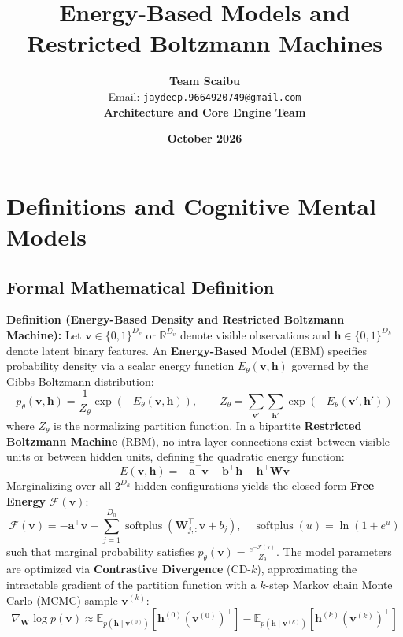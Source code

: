 \documentclass[11pt,a4paper]{article}
\title{\textbf{Energy-Based Models and Restricted Boltzmann Machines}}
\author{\textbf{Team Scaibu} \\ \small Email: \texttt{jaydeep.9664920749@gmail.com} \\ \small \textbf{Architecture and Core Engine Team}}
\date{\textbf{October 2026}}
\theoremstyle{definition}
\begin{document}
\maketitle

\section{Definitions and Cognitive Mental Models}

\subsection{Formal Mathematical Definition}
\textbf{Definition (Energy-Based Density and Restricted Boltzmann Machine):}
Let $\mathbf{v} \in \{0, 1\}^{D_v}$ or $\mathbb{R}^{D_v}$ denote visible observations and $\mathbf{h} \in \{0, 1\}^{D_h}$ denote latent binary features. An \textbf{Energy-Based Model} (EBM) specifies probability density via a scalar energy function $E_\theta(\mathbf{v}, \mathbf{h})$ governed by the Gibbs-Boltzmann distribution:
{\boldmath
\begin{equation}
p_\theta(\mathbf{v}, \mathbf{h}) = \frac{1}{Z_\theta} \exp(-E_\theta(\mathbf{v}, \mathbf{h})), \qquad Z_\theta = \sum_{\mathbf{v}'} \sum_{\mathbf{h}'} \exp(-E_\theta(\mathbf{v}', \mathbf{h}'))
\end{equation}
}
where $Z_\theta$ is the normalizing partition function. In a bipartite \textbf{Restricted Boltzmann Machine} (RBM), no intra-layer connections exist between visible units or between hidden units, defining the quadratic energy function:
{\boldmath
\begin{equation}
E(\mathbf{v}, \mathbf{h}) = -\mathbf{a}^\top \mathbf{v} - \mathbf{b}^\top \mathbf{h} - \mathbf{h}^\top \mathbf{W} \mathbf{v}
\end{equation}
}
Marginalizing over all $2^{D_h}$ hidden configurations yields the closed-form \textbf{Free Energy} $\mathcal{F}(\mathbf{v})$:
{\boldmath
\begin{equation}
\mathcal{F}(\mathbf{v}) = -\mathbf{a}^\top \mathbf{v} - \sum_{j=1}^{D_h} \operatorname{softplus}\left( \mathbf{W}_{j, :}^\top \mathbf{v} + b_j \right), \quad \operatorname{softplus}(u) = \ln(1 + e^u)
\end{equation}
}
such that marginal probability satisfies $p_\theta(\mathbf{v}) = \frac{e^{-\mathcal{F}(\mathbf{v})}}{Z_\theta}$. The model parameters are optimized via \textbf{Contrastive Divergence} (CD-$k$), approximating the intractable gradient of the partition function with a $k$-step Markov chain Monte Carlo (MCMC) sample $\mathbf{v}^{(k)}$:
{\boldmath
\begin{equation}
\nabla_{\mathbf{W}} \log p(\mathbf{v}) \approx \mathbb{E}_{p(\mathbf{h} \mid \mathbf{v}^{(0)})}[\mathbf{h}^{(0)} (\mathbf{v}^{(0)})^\top] - \mathbb{E}_{p(\mathbf{h} \mid \mathbf{v}^{(k)})}[\mathbf{h}^{(k)} (\mathbf{v}^{(k)})^\top]
\end{equation}
}
\end{document}

